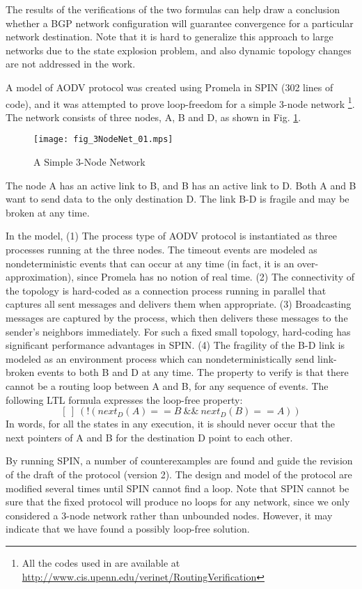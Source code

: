 \documentclass[a4paper,10pt,twocolumn]{article}
\begin{document}
The results of the verifications of the two formulas can help draw a conclusion whether a BGP network configuration will guarantee convergence for a particular network destination. Note that it is hard to generalize this approach to large networks due to the state explosion problem, and also dynamic topology changes are not addressed in the work.

A model of AODV protocol was created using Promela in SPIN (302 lines of code), and it was attempted to prove loop-freedom for a simple 3-node network \cite{BOG02}\footnote{All the codes used in \cite{BOG02} are available at \url{http://www.cis.upenn.edu/verinet/RoutingVerification}}. The network consists of three nodes, A, B and D, as shown in Fig. \ref{Fig:3NodeNet}.
\begin{figure}
  \centering
  \texttt{[image: fig\_3NodeNet\_01.mps]}\\
  \caption{A Simple 3-Node Network}\label{Fig:3NodeNet}
\end{figure}
The node A has an active link to B, and B has an active link to D. Both A and B want to send data to the only destination D. The link B-D is fragile and may be broken at any time.

In the model, (1) The process type of AODV protocol is instantiated as three processes running at the three nodes. The timeout events are modeled as nondeterministic events that can occur at any time (in fact, it is an over-approximation), since Promela has no notion of real time. (2) The connectivity of the topology is hard-coded as a connection process running in parallel that captures all sent messages and delivers them when appropriate. (3) Broadcasting messages are captured by the process, which then delivers these messages to the sender's neighbors immediately. For such a fixed small topology, hard-coding has significant performance advantages in SPIN. (4) The fragility of the B-D link is modeled as an environment process which can nondeterministically send link-broken events to both B and D at any time. The property to verify is that there cannot be a routing loop between A and B, for any sequence of events. The following LTL formula expresses the loop-free property:
$$[~]~(!(next_D(A)==B~\&\&~next_D(B)==A))$$
In words, for all the states in any execution, it is should never occur that the next pointers of A and B for the destination D point to each other.

By running SPIN, a number of counterexamples are found and guide the revision of the draft of the protocol (version 2). The design and model of the protocol are modified several times until SPIN cannot find a loop. Note that SPIN cannot be sure that the fixed protocol will produce no loops for any network, since we only considered a 3-node network rather than unbounded nodes. However, it may indicate that we have found a possibly loop-free solution.
\end{document}
